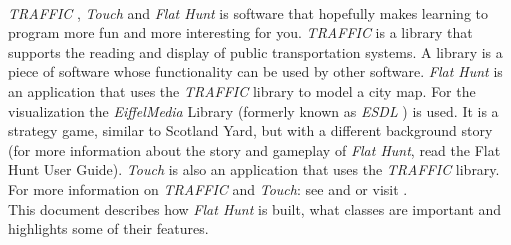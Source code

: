 \paragraph{}
\emph{TRAFFIC} \cite{dgsa05}, \emph{Touch} \cite{dgrk05} and \emph{Flat Hunt} is software that hopefully makes learning to program more fun and more interesting for you. \emph{TRAFFIC} is a library that supports the reading and display of public transportation systems. A library is a piece of software whose functionality can be used by other software. \emph{Flat Hunt} is an application that uses the \emph{TRAFFIC} library to model a city map. For the visualization the \emph{EiffelMedia} Library (formerly known as \emph{ESDL} \cite{dgtgb03}\cite{dgbb04}) is used. It is a strategy game, similar to Scotland Yard, but with a different background story (for more information about the story and gameplay of \emph{Flat Hunt}, read the Flat Hunt User Guide). \emph{Touch} is also an application that uses the \emph{TRAFFIC} library. For more information on \emph{TRAFFIC} and \emph{Touch}: see \cite{dgsa05} and \cite{dgrk05} or visit .\\

  This document describes how \emph{Flat Hunt} is built, what classes are important and highlights some of their features.

